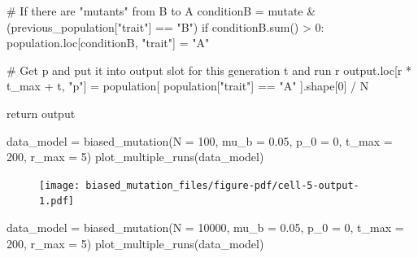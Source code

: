 \documentclass[
  a4paperpaper,
  ,captions=tableheading
]{scrbook}
\newenvironment{Shaded}{\begin{snugshade}}{\end{snugshade}}
\newcommand{\BuiltInTok}[1]{\textcolor[rgb]{0.00,0.23,0.31}{#1}}
\newcommand{\CommentTok}[1]{\textcolor[rgb]{0.37,0.37,0.37}{#1}}
\newcommand{\ControlFlowTok}[1]{\textcolor[rgb]{0.00,0.23,0.31}{#1}}
\newcommand{\DecValTok}[1]{\textcolor[rgb]{0.68,0.00,0.00}{#1}}
\newcommand{\FloatTok}[1]{\textcolor[rgb]{0.68,0.00,0.00}{#1}}
\newcommand{\NormalTok}[1]{\textcolor[rgb]{0.00,0.23,0.31}{#1}}
\newcommand{\OperatorTok}[1]{\textcolor[rgb]{0.37,0.37,0.37}{#1}}
\newcommand{\StringTok}[1]{\textcolor[rgb]{0.13,0.47,0.30}{#1}}
\begin{document}
\begin{Shaded}
\begin{Highlighting}[]
            \CommentTok{\# If there are "mutants" from B to A}
\NormalTok{            conditionB }\OperatorTok{=}\NormalTok{ mutate }\OperatorTok{\&}\NormalTok{ (previous\_population[}\StringTok{"trait"}\NormalTok{] }\OperatorTok{==} \StringTok{"B"}\NormalTok{)}
            \ControlFlowTok{if}\NormalTok{ conditionB.}\BuiltInTok{sum}\NormalTok{() }\OperatorTok{\textgreater{}} \DecValTok{0}\NormalTok{:}
\NormalTok{                population.loc[conditionB, }\StringTok{"trait"}\NormalTok{] }\OperatorTok{=} \StringTok{"A"}

            \CommentTok{\# Get p and put it into output slot for this generation t and run r}
\NormalTok{            output.loc[r }\OperatorTok{*}\NormalTok{ t\_max }\OperatorTok{+}\NormalTok{ t, }\StringTok{"p"}\NormalTok{] }\OperatorTok{=}\NormalTok{ population[ population[}\StringTok{"trait"}\NormalTok{] }\OperatorTok{==} \StringTok{"A"}\NormalTok{ ].shape[}\DecValTok{0}\NormalTok{] }\OperatorTok{/}\NormalTok{ N}

    \ControlFlowTok{return}\NormalTok{ output }
\end{Highlighting}
\end{Shaded}

\begin{Shaded}
\begin{Highlighting}[]
\NormalTok{data\_model }\OperatorTok{=}\NormalTok{ biased\_mutation(N }\OperatorTok{=} \DecValTok{100}\NormalTok{, mu\_b }\OperatorTok{=} \FloatTok{0.05}\NormalTok{, p\_0 }\OperatorTok{=} \DecValTok{0}\NormalTok{, t\_max }\OperatorTok{=} \DecValTok{200}\NormalTok{, r\_max }\OperatorTok{=} \DecValTok{5}\NormalTok{)}
\NormalTok{plot\_multiple\_runs(data\_model)}
\end{Highlighting}
\end{Shaded}

\begin{figure}[H]

{\centering \texttt{[image: biased\_mutation\_files/figure-pdf/cell-5-output-1.pdf]}

}

\end{figure}

\begin{Shaded}
\begin{Highlighting}[]
\NormalTok{data\_model }\OperatorTok{=}\NormalTok{ biased\_mutation(N }\OperatorTok{=} \DecValTok{10000}\NormalTok{, mu\_b }\OperatorTok{=} \FloatTok{0.05}\NormalTok{, p\_0 }\OperatorTok{=} \DecValTok{0}\NormalTok{, t\_max }\OperatorTok{=} \DecValTok{200}\NormalTok{, r\_max }\OperatorTok{=} \DecValTok{5}\NormalTok{)}
\NormalTok{plot\_multiple\_runs(data\_model)}
\end{Highlighting}
\end{Shaded}
\end{document}
